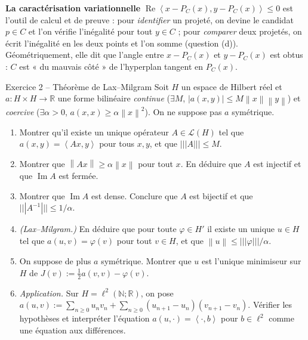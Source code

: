 \documentclass[11pt,a4paper]{article}
\newcommand{\R}{\mathbb{R}}
\newcommand{\N}{\mathbb{N}}
\newcommand{\norm}[1]{\left\|#1\right\|}
\newcommand{\opnorm}[1]{|\!|\!|#1|\!|\!|}
\newcommand{\ps}[2]{\left\langle #1,#2\right\rangle}
\newcommand{\Lc}{\mathcal{L}}
\DeclareMathOperator{\Ima}{Im}
\renewcommand{\Re}{\operatorname{Re}}
\theoremstyle{definition}
\begin{document}
\begin{pointcle}
\textbf{La caractérisation variationnelle} $\Re\ps{x-P_C(x)}{y-P_C(x)}\le0$ est l'outil de calcul et de preuve : pour \emph{identifier} un projeté, on devine le candidat $p\in C$ et l'on vérifie l'inégalité pour tout $y\in C$ ; pour \emph{comparer} deux projetés, on écrit l'inégalité en les deux points et l'on somme (question (d)). Géométriquement, elle dit que l'angle entre $x-P_C(x)$ et $y-P_C(x)$ est obtus : $C$ est « du mauvais côté » de l'hyperplan tangent en $P_C(x)$.
\end{pointcle}

\begin{exo}{Exercice 2 -- Théorème de Lax--Milgram}
Soit $H$ un espace de Hilbert réel et $a:H\times H\to\R$ une forme bilinéaire \emph{continue} ($\exists M$, $|a(x,y)|\le M\norm x\norm y$) et \emph{coercive} ($\exists\alpha>0$, $a(x,x)\ge\alpha\norm x^2$). On ne suppose pas $a$ symétrique.
\begin{enumerate}[label=(\alph*)]
  \item Montrer qu'il existe un unique opérateur $A\in\Lc(H)$ tel que $a(x,y)=\ps{Ax}y$ pour tous $x,y$, et que $\opnorm A\le M$.
  \item Montrer que $\norm{Ax}\ge\alpha\norm x$ pour tout $x$. En déduire que $A$ est injectif et que $\Ima A$ est fermée.
  \item Montrer que $\Ima A$ est dense. Conclure que $A$ est bijectif et que $\opnorm{A^{-1}}\le1/\alpha$.
  \item \emph{(Lax--Milgram.)} En déduire que pour toute $\varphi\in H'$ il existe un unique $u\in H$ tel que $a(u,v)=\varphi(v)$ pour tout $v\in H$, et que $\norm u\le\opnorm\varphi/\alpha$.
  \item On suppose de plus $a$ symétrique. Montrer que $u$ est l'unique minimiseur sur $H$ de $J(v):=\frac12a(v,v)-\varphi(v)$.
  \item \emph{Application.} Sur $H=\ell^2(\N;\R)$, on pose $a(u,v):=\sum_{n\ge0}u_nv_n+\sum_{n\ge0}(u_{n+1}-u_n)(v_{n+1}-v_n)$. Vérifier les hypothèses et interpréter l'équation $a(u,\cdot)=\ps\cdot b$ pour $b\in\ell^2$ comme une équation aux différences.
\end{enumerate}
\end{exo}
\end{document}

